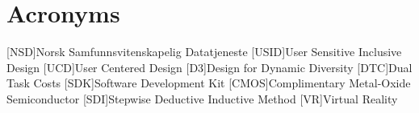 \chapter*{Acronyms}
\begin{acronym}
[NSD]{Norsk Samfunnsvitenskapelig Datatjeneste}
[USID]{User Sensitive Inclusive Design}
[UCD]{User Centered Design}
[D3]{Design for Dynamic Diversity}
[DTC]{Dual Task Costs}
[SDK]{Software Development Kit}
[CMOS]{Complimentary Metal-Oxide Semiconductor}
[SDI]{Stepwise Deductive Inductive Method}
[VR]{Virtual Reality}
\end{acronym}